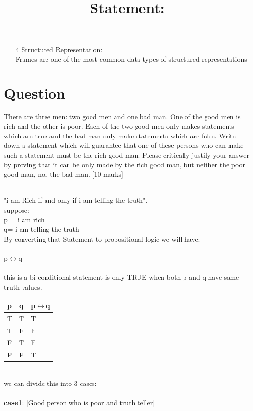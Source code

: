 \documentclass[12pt,a4paper]{article}
\begin{document}
{\begin{itemize}
		\item[4] Structured Representation:\\
		Frames are one of the most common data types of structured representations
		\end{itemize}
	

\newpage

		
	\section{Question}	
	There are three men: two good men and one bad man. One of the good men is rich and the other is poor. Each of the two good men only makes statements which are true and the bad man only make statements which are false. Write down a statement which will guarantee that one of these persons who can make such a statement must be the rich good man. Please critically justify your answer by proving that it can be only made by the rich good man, but neither the poor good man, nor the bad man.
	[10 marks]\\
	
	\title{Statement:}\\
	"i am Rich if and only if i am telling the truth".\\
	
	suppose: \\
	p = i am rich\\
	q= i am telling the truth\\
	By converting that Statement to propositional logic we will have:\\
	\\
	p$\leftrightarrow$q\\
	\\
	this is a bi-conditional statement is only TRUE when both p and q have same truth values. 
	
		\begin{tabular} {|l|l||l|}
		\hline
		\hline
		p&q&	p$\leftrightarrow$q \\
		\hline
		\hline
		T&T&T \\
		T&F&F \\
		F&T&F \\
		F&F&T \\
	
		
	\end{tabular}\\

we can divide this into 3 cases:\\
\\
\textbf{case1:} [Good person who is poor and truth teller]

}
\end{document}
